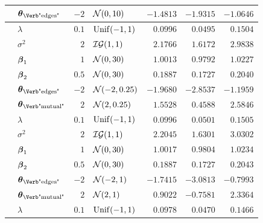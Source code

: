 \begin{table}[t]
\begin{tabular}{cl|rlrrr}
        & $\ttheta_{\text{\Verb"edges"}}$  & $-2$  & $\mathcal{N}(0,10)$ & $-1.4813$ & $-1.9315$ & $-1.0646$ \\
		\midrule
		\midrule
        & $\lambda$                        & $0.1$ & $\mathrm{Unif}(-1,1)$          & $0.0996$  & $0.0495$  & $0.1504$  \\
        & $\sigma^2$                       & $2$   & $\mathcal{IG}(1,1)$      & $2.1766$  & $1.6172$  & $2.9838$  \\
        & $\boldsymbol{\beta}_{1}$                     & $1$   & $\mathcal{N}(0,30)$           & $1.0013$  & $0.9792$  & $1.0227$  \\
        & $\boldsymbol{\beta}_{2}$                     & $0.5$ & $\mathcal{N}(0,30)$           & $0.1887$  & $0.1727$  & $0.2040$  \\
        & $\ttheta_{\text{\Verb"edges"}}$  & $-2$  & $\mathcal{N}(-2,0.25)$ & $-1.9680$ & $-2.8537$ & $-1.1959$ \\
        & $\ttheta_{\text{\Verb"mutual"}}$ & $2$   & $\mathcal{N}(2,0.25)$  & $1.5528$  & $0.4588$  & $2.5846$  \\
		\midrule
        & $\lambda$                        & $0.1$ & $\mathrm{Unif}(-1,1)$       & $0.0996$  & $0.0501$  & $0.1505$  \\
        & $\sigma^2$                       & $2$   & $\mathcal{IG}(1,1)$   & $2.2045$  & $1.6301$  & $3.0302$  \\
        & $\boldsymbol{\beta}_{1}$                     & $1$   & $\mathcal{N}(0,30)$        & $1.0017$  & $0.9804$  & $1.0234$  \\
        & $\boldsymbol{\beta}_{2}$                     & $0.5$ & $\mathcal{N}(0,30)$        & $0.1887$  & $0.1727$  & $0.2043$  \\
        & $\ttheta_{\text{\Verb"edges"}}$  & $-2$  & $\mathcal{N}(-2,1)$ & $-1.7415$ & $-3.0813$ & $-0.7993$ \\
        & $\ttheta_{\text{\Verb"mutual"}}$ & $2$   & $\mathcal{N}(2,1)$  & $0.9022$  & $-0.7581$ & $2.3364$  \\
		\midrule
        & $\lambda$                        & $0.1$ & $\mathrm{Unif}(-1,1)$       & $0.0978$  & $0.0470$  & $0.1466$  \\

\end{tabular}
\end{table}
